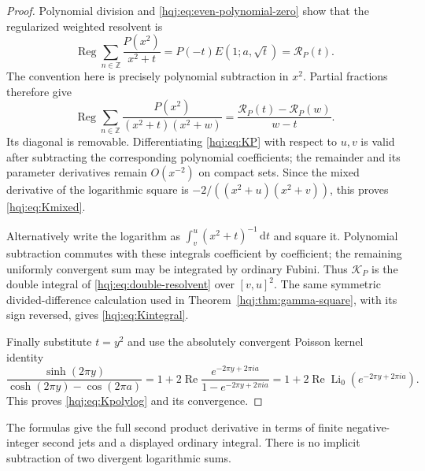 \documentclass[11pt,letterpaper]{article}
\numberwithin{equation}{section}
\theoremstyle{definition}
\newcommand{\Li}{\operatorname{Li}}
\newcommand{\Reg}{\operatorname{Reg}}
\newcommand{\Rea}{\operatorname{Re}}
\newcommand{\dd}{\,\mathrm{d}}
\newcommand{\Z}{\mathbb Z}
\begin{document}
\begin{proof}
Polynomial division and \eqref{hqj:eq:even-polynomial-zero} show that
the regularized weighted resolvent is
\[
\Reg\sum_{n\in\Z}\frac{P(x^2)}{x^2+t}
=P(-t)E(1;a,\sqrt t)=\mathcal R_P(t).
\]
The convention here is precisely polynomial subtraction in $x^2$.
Partial fractions therefore give
\begin{equation}\label{hqj:eq:double-resolvent}
\Reg\sum_{n\in\Z}\frac{P(x^2)}{(x^2+t)(x^2+w)}
=\frac{\mathcal R_P(t)-\mathcal R_P(w)}{w-t}.
\end{equation}
Its diagonal is removable. Differentiating
\eqref{hqj:eq:KP} with respect to $u,v$ is valid after subtracting the
corresponding polynomial coefficients; the remainder and its
parameter derivatives remain $O(x^{-2})$ on compact sets. Since the
mixed derivative of the logarithmic square is
$-2/((x^2+u)(x^2+v))$, this proves \eqref{hqj:eq:Kmixed}.

Alternatively write the logarithm as
$\int_v^u(x^2+t)^{-1}\dd t$ and square it. Polynomial subtraction
commutes with these integrals coefficient by coefficient; the remaining
uniformly convergent sum may be integrated by ordinary Fubini. Thus
$\mathcal K_P$ is the double integral of
\eqref{hqj:eq:double-resolvent} over $[v,u]^2$.
The same symmetric divided-difference calculation used in
Theorem~\ref{hqj:thm:gamma-square}, with its sign reversed, gives
\eqref{hqj:eq:Kintegral}.

Finally substitute $t=y^2$ and use the absolutely convergent Poisson
kernel identity
\[
\frac{\sinh(2\pi y)}{\cosh(2\pi y)-\cos(2\pi a)}
=1+2\Rea\frac{e^{-2\pi y+2\pi ia}}{1-e^{-2\pi y+2\pi ia}}
=1+2\Rea\Li_0(e^{-2\pi y+2\pi ia}).
\]
This proves \eqref{hqj:eq:Kpolylog} and its convergence.
\end{proof}
The formulas give the full second product derivative in terms of
finite negative-integer second jets and a displayed ordinary integral.
There is no implicit subtraction of two divergent logarithmic sums.
\end{document}

